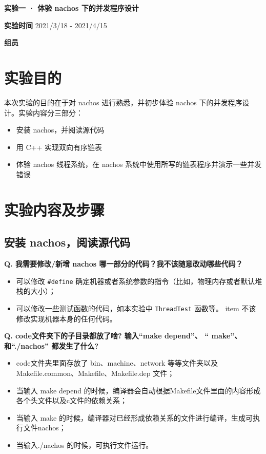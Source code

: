 \documentclass[a4paper,12pt]{article}
\begin{document}
\setcounter{page}{1}
\begin{center}
    \par \Large \textbf{实验一 · 体验 nachos 下的并发程序设计}
    \vspace{1em}
\end{center}

\normalsize
\par \textbf{实验时间} 2021/3/18 - 2021/4/15
\vspace{0.5em}
\par \textbf{组员}
\vspace{2em}

\section{实验目的}
\par 本次实验的目的在于对 nachos 进行熟悉，并初步体验 nachos 下的并发程序设计。实验内容分三部分：
\begin{itemize}
    \item 安装 nachos，并阅读源代码
    \item 用 C++ 实现双向有序链表
    \item 体验 nachos 线程系统，在 nachos 系统中使用所写的链表程序并演示一些并发错误
\end{itemize}

\section{实验内容及步骤}
\subsection{安装 nachos，阅读源代码}
\par\textbf{Q. 我需要修改/新增 nachos 哪一部分的代码？我不该随意改动哪些代码？}
\begin{itemize}
    \item 可以修改 \texttt{#define} 确定机器或者系统参数的指令（比如，物理内存或者默认堆栈的大小）；
    \item 可以修改一些测试函数的代码，如本实验中 \texttt{ThreadTest} 函数等。
    item 不该修改实现机器本身的任何代码。
\end{itemize}

\par\textbf{Q. code文件夹下的子目录都放了啥? 输入“make depend”、 “ make”、和“./nachos” 都发生了什么? }
\begin{itemize}
    \item code文件夹里面存放了 bin、machine、network 等等文件夹以及 Makefile.common、Makefile、Makefile.dep 文件；
    \item 当输入 make depend 的时候，编译器会自动根据Makefile文件里面的内容形成各个头文件以及c文件的依赖关系；
    \item 当输入 make 的时候，编译器对已经形成依赖关系的文件进行编译，生成可执行文件nachos；
    \item 当输入./nachos 的时候，可执行文件运行。
\end{itemize}
\end{document}

